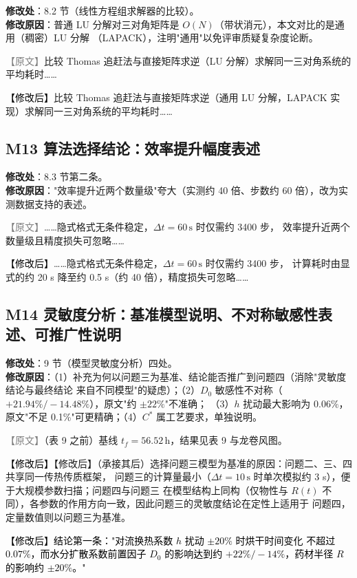 \documentclass[UTF8,zihao=-4]{ctexart}
\newcommand{\yuanduan}[1]{\par\noindent\textcolor{gray}{\small 【原文】}#1\par}
\newcommand{\xinduan}[1]{\par\noindent\textcolor{black}{\small 【修改后】}#1\par}
\begin{document}
\textbf{修改处}：8.2 节（线性方程组求解器的比较）。\\
\textbf{修改原因}：普通 LU 分解对三对角矩阵是 $O(N)$（带状消元），本文对比的是通用（稠密）LU 分解
（LAPACK），注明"通用"以免评审质疑复杂度论断。

\yuanduan{比较 Thomas 追赶法与直接矩阵求逆（LU 分解）求解同一三对角系统的平均耗时……}
\xinduan{比较 Thomas 追赶法与直接矩阵求逆（通用 LU 分解，LAPACK 实现）求解同一三对角系统的平均耗时……}

\subsection*{M13 算法选择结论：效率提升幅度表述}

\textbf{修改处}：8.3 节第二条。\\
\textbf{修改原因}："效率提升近两个数量级"夸大（实测约 40 倍、步数约 60 倍），改为实测数据支持的表述。

\yuanduan{……隐式格式无条件稳定，$\Delta t=60\,\mathrm{s}$ 时仅需约 3400 步，
效率提升近两个数量级且精度损失可忽略……}
\xinduan{……隐式格式无条件稳定，$\Delta t=60\,\mathrm{s}$ 时仅需约 3400 步，
计算耗时由显式的约 20 s 降至约 0.5 s（约 40 倍），精度损失可忽略……}

\subsection*{M14 灵敏度分析：基准模型说明、不对称敏感性表述、可推广性说明}

\textbf{修改处}：9 节（模型灵敏度分析）四处。\\
\textbf{修改原因}：（1）补充为何以问题三为基准、结论能否推广到问题四（消除"灵敏度结论与最终结论
来自不同模型"的疑虑）；（2）$D_0$ 敏感性不对称（$+21.94\%/-14.48\%$），原文"约 $\pm22\%$"不准确；
（3）$h$ 扰动最大影响为 $0.06\%$，原文"不足 0.1\%"可更精确；（4）$C^{*}$ 属工艺要求，单独说明。

\yuanduan{\small （表 9 之前）基线 $t_f=56.52\,\mathrm{h}$，结果见表 9 与龙卷风图。}
\xinduan{\small 【修改后】（承接其后）选择问题三模型为基准的原因：问题二、三、四共享同一传热传质框架，
问题三的计算量最小（$\Delta t=10\,\mathrm{s}$ 时单次模拟约 3 s），便于大规模参数扫描；问题四与问题三
在模型结构上同构（仅物性与 $R(t)$ 不同），各参数的作用方向一致，因此问题三的灵敏度结论在定性上适用于
问题四，定量数值则以问题三为基准。}

\noindent\textcolor{black}{\small 【修改后】结论第一条："对流换热系数 $h$ 扰动 $\pm20\%$ 时烘干时间变化
不超过 $0.07\%$，而水分扩散系数前置因子 $D_0$ 的影响达到约 $+22\%/-14\%$，药材半径 $R$ 的影响约
$\pm20\%$。"}
\end{document}
